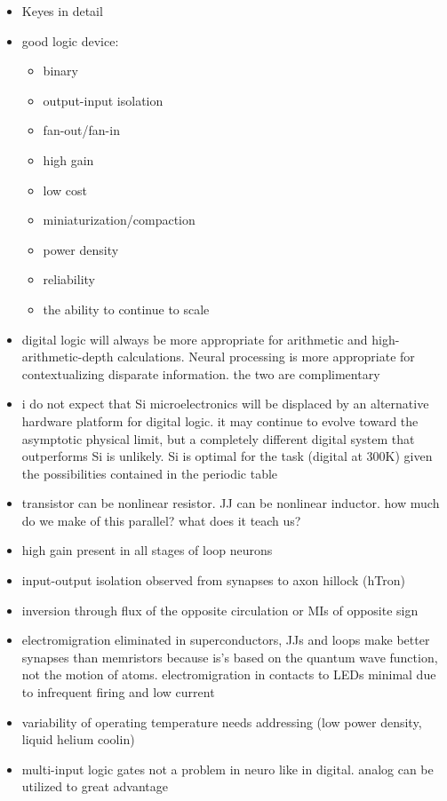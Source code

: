 \documentclass[twocolumn]{article}
\begin{document}
\begin{itemize}
\item Keyes in detail
\item good logic device:
\begin{itemize}
\item binary
\item output-input isolation
\item fan-out/fan-in
\item high gain
\item low cost
\item miniaturization/compaction
\item power density
\item reliability
\item the ability to continue to scale
\end{itemize}
\item digital logic will always be more appropriate for arithmetic and high-arithmetic-depth calculations. Neural processing is more appropriate for contextualizing disparate information. the two are complimentary
\item i do not expect that Si microelectronics will be displaced by an alternative hardware platform for digital logic. it may continue to evolve toward the asymptotic physical limit, but a completely different digital system that outperforms Si is unlikely. Si is optimal for the task (digital at 300K) given the possibilities contained in the periodic table
\item transistor can be nonlinear resistor. JJ can be nonlinear inductor. how much do we make of this parallel? what does it teach us?
\item high gain present in all stages of loop neurons
\item input-output isolation observed from synapses to axon hillock (hTron)
\item inversion through flux of the opposite circulation or MIs of opposite sign
\item electromigration eliminated in superconductors, JJs and loops make better synapses than memristors because is's based on the quantum wave function, not the motion of atoms. electromigration in contacts to LEDs minimal due to infrequent firing and low current
\item variability of operating temperature needs addressing (low power density, liquid helium coolin)
\item multi-input logic gates not a problem in neuro like in digital. analog can be utilized to great advantage

\end{itemize}
\end{document}
